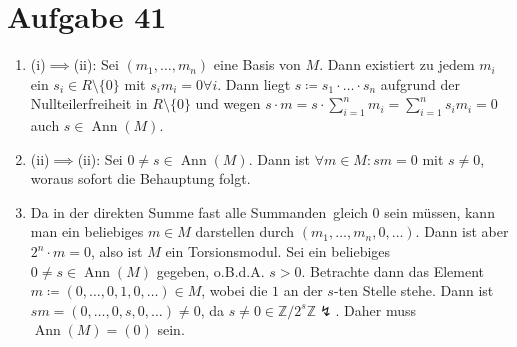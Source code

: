 \documentclass{article}
\theoremstyle{definition}
\newcommand{\Z}{\mathbb{Z}}
\begin{document}
\section*{Aufgabe 41}
\begin{enumerate}
    \item (i)$\implies$(ii): Sei $(m_1, \dots, m_n)$ eine Basis von $M$. Dann existiert zu jedem $m_i$ ein $s_i\in R\setminus\{0\}$ mit $s_im_i = 0\forall i$. Dann liegt $s \coloneqq s_1\cdot \dots\cdot s_n$ aufgrund der Nullteilerfreiheit in $R\setminus\{0\}$ und wegen $s \cdot m = s \cdot \sum_{i = 1}^{n}m_i = \sum_{i = 1}^{n}s_im_i = 0$ auch $s\in \operatorname{Ann}(M)$.
    \item (ii)$\implies$(ii): Sei $0 \neq s \in \operatorname{Ann}(M)$. Dann ist $\forall m \in M\colon sm = 0$ mit $s \neq 0$, woraus sofort die Behauptung folgt.
    \item Da in der direkten Summe fast alle \glqq Summanden\grqq\ gleich $0$ sein müssen, kann man ein beliebiges $m\in M$ darstellen durch $(m_1, \dots, m_n, 0, \dots)$. Dann ist aber $2^n\cdot m = 0$, also ist $M$ ein Torsionsmodul. Sei ein beliebiges $0 \neq s\in \operatorname{Ann}(M)$ gegeben, o.B.d.A. $s > 0$. Betrachte dann das Element $m \coloneqq (0,\dots, 0,1,0, \dots)\in M$, wobei die $1$ an der $s$-ten Stelle stehe. Dann ist $sm = (0,\dots, 0 , s, 0, \dots) \neq 0$, da $s\neq 0 \in \Z/2^s\Z \lightning$. Daher muss $\operatorname{Ann}(M) = (0)$ sein.
\end{enumerate}
\end{document}
